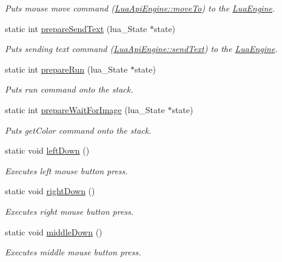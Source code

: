 \begin{DoxyCompactItemize}
\begin{DoxyCompactList}\small\item\em Puts mouse move command (\hyperlink{class_lua_api_engine_a8512ba309e37218b1586f8a41cae4451}{Lua\-Api\-Engine\-::move\-To}) to the \hyperlink{class_lua_engine}{Lua\-Engine}. \end{DoxyCompactList}\item 
static int \hyperlink{class_lua_api_engine_a8f327b5c6d5819c9078b53a665842c47}{prepare\-Send\-Text} (lua\-\_\-\-State $\ast$state)
\begin{DoxyCompactList}\small\item\em Puts sending text command (\hyperlink{class_lua_api_engine_a396ae61c3f7c771f5fe06584cef15169}{Lua\-Api\-Engine\-::send\-Text}) to the \hyperlink{class_lua_engine}{Lua\-Engine}. \end{DoxyCompactList}\item 
static int \hyperlink{class_lua_api_engine_aedff90d60bc2f217557e93c297c2a226}{prepare\-Run} (lua\-\_\-\-State $\ast$state)
\begin{DoxyCompactList}\small\item\em Puts run command onto the stack. \end{DoxyCompactList}\item 
static int \hyperlink{class_lua_api_engine_ac79f2f968c53a1d2d29cd40557fd363a}{prepare\-Wait\-For\-Image} (lua\-\_\-\-State $\ast$state)
\begin{DoxyCompactList}\small\item\em Puts get\-Color command onto the stack. \end{DoxyCompactList}\item 
static void \hyperlink{class_lua_api_engine_a5942498f999031601960d890b259536b}{left\-Down} ()
\begin{DoxyCompactList}\small\item\em Executes left mouse button press. \end{DoxyCompactList}\item 
static void \hyperlink{class_lua_api_engine_a14df77fdabe3ddf5dd19c35e70acb2d8}{right\-Down} ()
\begin{DoxyCompactList}\small\item\em Executes right mouse button press. \end{DoxyCompactList}\item 
static void \hyperlink{class_lua_api_engine_abea870a5edb171b0bc2345dd1e1e7b95}{middle\-Down} ()
\begin{DoxyCompactList}\small\item\em Executes middle mouse button press. \end{DoxyCompactList}\item 

\end{DoxyCompactItemize}
